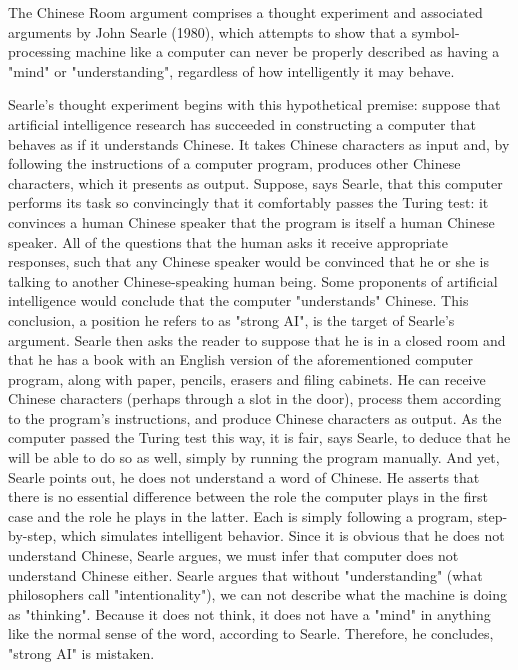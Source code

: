 The Chinese Room argument comprises a thought experiment and associated arguments by John Searle (1980), which attempts to show that a symbol-processing machine like a computer can never be properly described as having a "mind" or "understanding", regardless of how intelligently it may behave.

Searle's thought experiment begins with this hypothetical premise: suppose that artificial intelligence research has succeeded in constructing a computer that behaves as if it understands Chinese. It takes Chinese characters as input and, by following the instructions of a computer program, produces other Chinese characters, which it presents as output. Suppose, says Searle, that this computer performs its task so convincingly that it comfortably passes the Turing test: it convinces a human Chinese speaker that the program is itself a human Chinese speaker. All of the questions that the human asks it receive appropriate responses, such that any Chinese speaker would be convinced that he or she is talking to another Chinese-speaking human being.
Some proponents of artificial intelligence would conclude that the computer "understands" Chinese. This conclusion, a position he refers to as "strong AI", is the target of Searle's argument.
Searle then asks the reader to suppose that he is in a closed room and that he has a book with an English version of the aforementioned computer program, along with paper, pencils, erasers and filing cabinets. He can receive Chinese characters (perhaps through a slot in the door), process them according to the program's instructions, and produce Chinese characters as output. As the computer passed the Turing test this way, it is fair, says Searle, to deduce that he will be able to do so as well, simply by running the program manually.
And yet, Searle points out, he does not understand a word of Chinese. He asserts that there is no essential difference between the role the computer plays in the first case and the role he plays in the latter. Each is simply following a program, step-by-step, which simulates intelligent behavior. Since it is obvious that he does not understand Chinese, Searle argues, we must infer that computer does not understand Chinese either.
Searle argues that without "understanding" (what philosophers call "intentionality"), we can not describe what the machine is doing as "thinking". Because it does not think, it does not have a "mind" in anything like the normal sense of the word, according to Searle. Therefore, he concludes, "strong AI" is mistaken.


